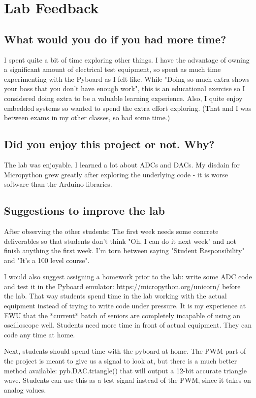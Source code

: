 \documentclass[11pt]{article}
\begin{document}
{	\section{Lab Feedback}
	\subsection{What would you do if you had more time?}
	I spent quite a bit of time exploring other things. I have the advantage of owning a significant amount of electrical test equipment, so spent as much time experimenting with the Pyboard as I felt like. While "Doing so much extra shows your boss that you don't have enough work", this is an educational exercise so I considered doing extra to be a valuable learning experience. Also, I quite enjoy embedded systems so wanted to spend the extra effort exploring. (That and I was between exams in my other classes, so had some time.)
	
	\subsection{Did you enjoy this project or not. Why?}
	The lab was enjoyable. I learned a lot about ADCs and DACs. My disdain for Micropython grew greatly after exploring the underlying code - it is worse software than the Arduino libraries.
	
	\subsection{Suggestions to improve the lab}
	After observing the other students: The first week needs some concrete deliverables so that students don't think "Oh, I can do it next week" and not finish anything the first week. I'm torn between saying "Student Responsibility" and "It's a 100 level course". 
	
	I would also suggest assigning a homework prior to the lab: write some ADC code and test it in the Pyboard emulator: https://micropython.org/unicorn/ before the lab. That way students spend time in the lab working with the actual equipment instead of trying to write code under pressure. It is my experience at EWU that the *current* batch of seniors are completely incapable of using an oscilloscope well. Students need more time in front of actual equipment. They can code any time at home.
	
	Next, students should spend time with the pyboard at home. The PWM part of the project is meant to give us a signal to look at, but there is a much better method available: pyb.DAC.triangle() that will output a 12-bit accurate triangle wave. Students can use this as a test signal instead of the PWM, since it takes on analog values.
	
}
\end{document}
